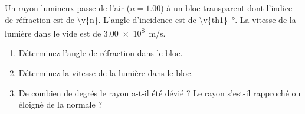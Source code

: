 Un rayon lumineux passe de l'air ($n = \num{1.00}$) à un bloc transparent dont l'indice de réfraction est de \num{\v{n}}. L'angle d'incidence est de \qty{\v{th1}}{\degree}. La vitesse de la lumière dans le vide est de \qty{3.00e8}{m/s}.

\begin{center}
\end{center}

\begin{enumerate}[label=\alph*)]
    \item Déterminez l'angle de réfraction dans le bloc.
    \item Déterminez la vitesse de la lumière dans le bloc.
    \item De combien de degrés le rayon a-t-il été dévié ? Le rayon s'est-il rapproché ou éloigné de la normale ?
\end{enumerate}
